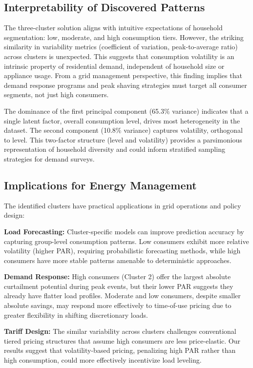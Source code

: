 \documentclass[11pt]{article}
\begin{document}
\subsection{Interpretability of Discovered Patterns}

The three-cluster solution aligns with intuitive expectations of household segmentation: low, moderate, and high consumption tiers. However, the striking similarity in variability metrics (coefficient of variation, peak-to-average ratio) across clusters is unexpected. This suggests that consumption volatility is an intrinsic property of residential demand, independent of household size or appliance usage. From a grid management perspective, this finding implies that demand response programs and peak shaving strategies must target all consumer segments, not just high consumers.

The dominance of the first principal component (65.3\% variance) indicates that a single latent factor, overall consumption level, drives most heterogeneity in the dataset. The second component (10.8\% variance) captures volatility, orthogonal to level. This two-factor structure (level and volatility) provides a parsimonious representation of household diversity and could inform stratified sampling strategies for demand surveys.

\subsection{Implications for Energy Management}

The identified clusters have practical applications in grid operations and policy design:

\textbf{Load Forecasting:} Cluster-specific models can improve prediction accuracy by capturing group-level consumption patterns. Low consumers exhibit more relative volatility (higher PAR), requiring probabilistic forecasting methods, while high consumers have more stable patterns amenable to deterministic approaches.

\textbf{Demand Response:} High consumers (Cluster 2) offer the largest absolute curtailment potential during peak events, but their lower PAR suggests they already have flatter load profiles. Moderate and low consumers, despite smaller absolute savings, may respond more effectively to time-of-use pricing due to greater flexibility in shifting discretionary loads.

\textbf{Tariff Design:} The similar variability across clusters challenges conventional tiered pricing structures that assume high consumers are less price-elastic. Our results suggest that volatility-based pricing, penalizing high PAR rather than high consumption, could more effectively incentivize load leveling.
\end{document}
